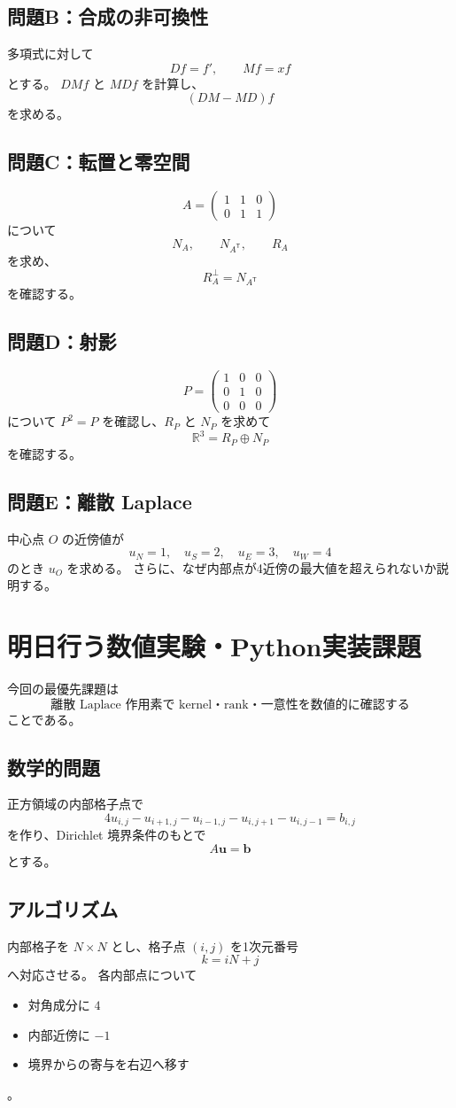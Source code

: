 \documentclass[a4paper,11pt]{ltjsarticle}
\newcommand{\R}{\mathbb{R}}
\begin{document}
\subsection*{問題B：合成の非可換性}
多項式に対して
\[
Df=f',\qquad Mf=xf
\]
とする。
$DMf$ と $MDf$ を計算し、
\[
(DM-MD)f
\]
を求める。

\subsection*{問題C：転置と零空間}
\[
A=
\begin{pmatrix}
1&1&0\\
0&1&1
\end{pmatrix}
\]
について
\[
N_A,\qquad N_{A^{\mathsf T}},\qquad R_A
\]
を求め、
\[
R_A^\perp=N_{A^{\mathsf T}}
\]
を確認する。

\subsection*{問題D：射影}
\[
P=
\begin{pmatrix}
1&0&0\\
0&1&0\\
0&0&0
\end{pmatrix}
\]
について $P^2=P$ を確認し、$R_P$ と $N_P$ を求めて
\[
\R^3=R_P\oplus N_P
\]
を確認する。

\subsection*{問題E：離散 Laplace}
中心点 $O$ の近傍値が
\[
u_N=1,\quad u_S=2,\quad u_E=3,\quad u_W=4
\]
のとき $u_O$ を求める。
さらに、なぜ内部点が4近傍の最大値を超えられないか説明する。

\section{明日行う数値実験・Python実装課題}

今回の最優先課題は
\[
\boxed{\text{離散 Laplace 作用素で kernel・rank・一意性を数値的に確認する}}
\]
ことである。

\subsection{数学的問題}
正方領域の内部格子点で
\[
4u_{i,j}
-u_{i+1,j}-u_{i-1,j}-u_{i,j+1}-u_{i,j-1}
=b_{i,j}
\]
を作り、Dirichlet 境界条件のもとで
\[
A\bm u=\bm b
\]
とする。

\subsection{アルゴリズム}
内部格子を $N\times N$ とし、格子点 $(i,j)$ を1次元番号
\[
k=iN+j
\]
へ対応させる。
各内部点について
\begin{itemize}
  \item 対角成分に $4$
  \item 内部近傍に $-1$
  \item 境界からの寄与を右辺へ移す
\end{itemize}
。
\end{document}
